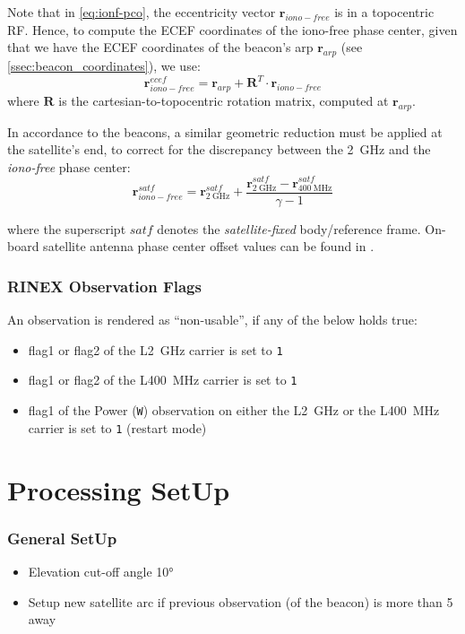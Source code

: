 Note that in \ref{eq:ionf-pco}, the eccentricity vector $\bm{r}_{iono-free}$ 
is in a topocentric RF. Hence, to compute the ECEF coordinates of the 
iono-free phase center, given that we have the ECEF coordinates of the beacon's 
\gls{arp} $\bm{r}_{arp}$ (see \ref{ssec:beacon_coordinates}), we use:
\begin{equation}
  \bm{r}^{ecef}_{iono-free} = \bm{r}_{arp} + \bm{R}^T \cdot \bm{r}_{iono-free}
\end{equation}
where $\bm{R}$ is the cartesian-to-topocentric rotation matrix, computed 
at $\bm{r}_{arp}$.

In accordance to the beacons, a similar geometric reduction must be applied 
at the satellite's end, to correct for the discrepancy between the \SI{2}{\GHz} 
and the \emph{iono-free} phase center:
\begin{equation}
  \bm{r}^{satf}_{iono-free} = \bm{r}^{satf}_{\SI{2}{\GHz}} + 
    \frac{\bm{r}^{satf}_{\SI{2}{\GHz}} - 
    \bm{r}^{satf}_{\SI{400}{\MHz}}}{\gamma - 1}
\end{equation}

where the superscript $satf$ denotes the \emph{satellite-fixed} body/reference 
frame. On-board satellite antenna phase center offset values can be found in 
\cite{DorisSatModels}.

\subsubsection{RINEX Observation Flags}
\label{sssec:rnx-flags}
An observation is rendered as ``non-usable'', if any of the below holds true:
\begin{itemize}
  \item flag1 or flag2 of the L\SI{2}{\giga\hertz} carrier is set to \texttt{1}
  \item flag1 or flag2 of the L\SI{400}{\mega\hertz} carrier is set to \texttt{1}
  \item flag1 of the Power (\texttt{W}) observation on either the L\SI{2}{\giga\hertz} 
    or the L\SI{400}{\mega\hertz} carrier is set to \texttt{1} (restart mode)
\end{itemize}

\section{Processing SetUp}

\subsubsection{General SetUp}
\begin{itemize}
  \item Elevation cut-off angle \ang{10}
  \item Setup new satellite arc if previous observation (of the beacon) is more 
    than \SI{5}{\min} away
\end{itemize}

